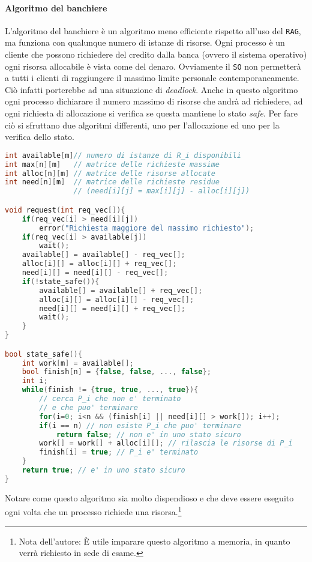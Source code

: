             \paragraph{Algoritmo del banchiere}
                L'algoritmo del banchiere è un algoritmo meno efficiente rispetto all'uso del \texttt{RAG}, ma funziona con qualunque numero di istanze di risorse.\newline
                Ogni processo è un cliente che possono richiedere del credito dalla banca (ovvero il sistema operativo) ogni risorsa allocabile è vista come del denaro. Ovviamente il \texttt{SO} non permetterà a tutti i clienti di raggiungere il massimo limite personale contemporaneamente. Ciò infatti porterebbe ad una situazione di \textit{deadlock}.\newline
                Anche in questo algoritmo ogni processo dichiarare il numero massimo di risorse che andrà ad richiedere, ad ogni richiesta di allocazione si verifica se questa mantiene lo stato \textit{safe}. Per fare ciò si sfruttano due algoritmi differenti, uno per l'allocazione ed uno per la verifica dello stato.
                \begin{lstlisting}[language=C++, caption={Algoritmo del banchiere}, label={lst:banker}, basicstyle=\small]
int available[m]// numero di istanze di R_i disponibili
int max[n][m]   // matrice delle richieste massime
int alloc[n][m] // matrice delle risorse allocate
int need[n][m]  // matrice delle richieste residue 
                // (need[i][j] = max[i][j] - alloc[i][j])

void request(int req_vec[]){
    if(req_vec[i] > need[i][j])
        error("Richiesta maggiore del massimo richiesto");
    if(req_vec[i] > available[j])
        wait();
    available[] = available[] - req_vec[];
    alloc[i][] = alloc[i][] + req_vec[];
    need[i][] = need[i][] - req_vec[];
    if(!state_safe()){
        available[] = available[] + req_vec[];
        alloc[i][] = alloc[i][] - req_vec[];
        need[i][] = need[i][] + req_vec[];
        wait();
    }
}

bool state_safe(){
    int work[m] = available[];
    bool finish[n] = {false, false, ..., false};
    int i;
    while(finish != {true, true, ..., true}){
        // cerca P_i che non e' terminato
        // e che puo' terminare
        for(i=0; i<n && (finish[i] || need[i][] > work[]); i++);
        if(i == n) // non esiste P_i che puo' terminare
            return false; // non e' in uno stato sicuro
        work[] = work[] + alloc[i][]; // rilascia le risorse di P_i
        finish[i] = true; // P_i e' terminato
    }
    return true; // e' in uno stato sicuro
}
                \end{lstlisting}
                Notare come questo algoritmo sia molto dispendioso e che deve essere eseguito ogni volta che un processo richiede una risorsa.\footnote{Nota dell'autore: È utile imparare questo algoritmo a memoria, in quanto verrà richiesto in sede di esame.}
